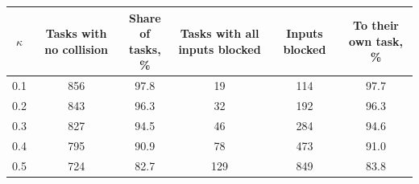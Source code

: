 \setlength{\tabcolsep}{3pt}%
\begin{tabular}{cccccc}
    \toprule
    $\kappa$ & Tasks with no collision & \shortstack[c]{Share of\\tasks, \%} & Tasks with all inputs blocked & Inputs blocked & To their own task, \% \\
    \midrule
    0.1 & 856 & 97.8 & 19 & 114 & 97.7 \\
    0.2 & 843 & 96.3 & 32 & 192 & 96.3 \\
    0.3 & 827 & 94.5 & 46 & 284 & 94.6 \\
    0.4 & 795 & 90.9 & 78 & 473 & 91.0 \\
    0.5 & 724 & 82.7 & 129 & 849 & 83.8 \\
    \bottomrule
\end{tabular}
